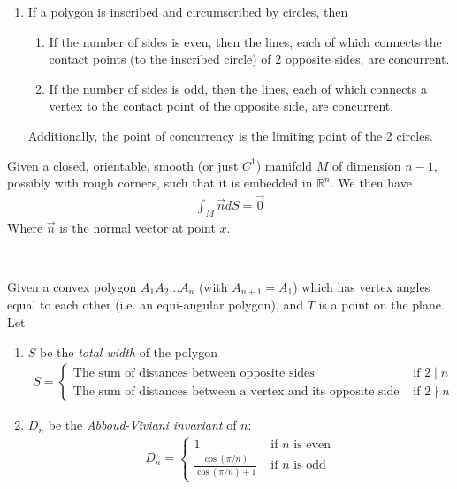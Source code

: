 \documentclass{treatise}
\begin{document}
\begin{shaded}
\begin{theorem}
\begin{enumerate}
\begin{enumerate}
	\end{enumerate}
	\item If a polygon is inscribed and circumscribed by circles, then
	\begin{enumerate}
		\item If the number of sides is even, then the lines, each of which connects the contact points (to the inscribed circle) of 2 opposite sides, are concurrent.
		\item If the number of sides is odd, then the lines, each of which connects a vertex to the contact point of the opposite side, are concurrent.
	\end{enumerate}
	Additionally, the point of concurrency is the limiting point of the 2 circles.
\end{enumerate}
\end{theorem}
\begin{theorem}
Given a closed, orientable, smooth (or just $C^1$) manifold $M$ of dimension $n - 1$, possibly with rough corners, such that it is embedded in $\mathbb{R}^n$. We then have
\begin{align*}
\int_{M} \vec{n} d S = \vec{0}
\end{align*}
Where $\vec{n}$ is the normal vector at point $x$.
\end{theorem}
\ \\
\begin{theorem}
Given a convex polygon $A_1 A_2 \hdots A_n$ (with $A_{n + 1} = A_1$) which has vertex angles equal to each other (i.e. an equi-angular polygon), and $T$ is a point on the plane. Let
\begin{enumerate}
	\item $S$ be the \emph{total width} of the polygon
	\begin{align*}
	S = \begin{cases}
	\mbox{The sum of distances between opposite sides} & \mbox{ if } 2 \mid n \\
	\mbox{The sum of distances between a vertex and its opposite side} & \mbox{ if } 2 \nmid n
	\end{cases}
	\end{align*}
	\item $D_n$ be the \emph{Abboud-Viviani invariant} of $n$:
	\begin{align*}
	D_n = \begin{cases}
	1 & \mbox{ if } n \mbox{ is even} \\
	\frac{\cos (\pi/n)}{\cos (\pi/n) + 1} & \mbox{ if } n \mbox{ is odd}

\end{cases}
\end{align*}
\end{enumerate}
\end{theorem}
\end{shaded}
\end{document}
